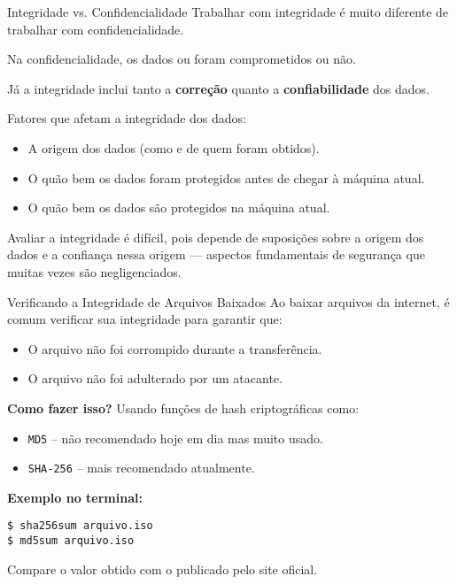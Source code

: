 \begin{frame}{Integridade vs. Confidencialidade}
Trabalhar com integridade é muito diferente de trabalhar com confidencialidade.

\vspace{0.3cm}
Na confidencialidade, os dados ou foram comprometidos ou não.

\vspace{0.3cm}
Já a integridade inclui tanto a \textbf{correção} quanto a \textbf{confiabilidade} dos dados.

\vspace{0.3cm}
Fatores que afetam a integridade dos dados:
\begin{itemize}
    \item A origem dos dados (como e de quem foram obtidos).
    \item O quão bem os dados foram protegidos antes de chegar à máquina atual.
    \item O quão bem os dados são protegidos na máquina atual.
\end{itemize}

\vspace{0.3cm}
Avaliar a integridade é difícil, pois depende de suposições sobre a origem dos dados e a confiança nessa origem — aspectos fundamentais de segurança que muitas vezes são negligenciados.
\end{frame}
\begin{frame}[fragile]{Verificando a Integridade de Arquivos Baixados}
Ao baixar arquivos da internet, é comum verificar sua integridade para garantir que:

\begin{itemize}
    \item O arquivo não foi corrompido durante a transferência.
    \item O arquivo não foi adulterado por um atacante.
\end{itemize}

\vspace{0.3cm}
\textbf{Como fazer isso?} Usando funções de hash criptográficas como:

\begin{itemize}
    \item \texttt{MD5} -- não recomendado hoje em dia mas muito usado.
    \item \texttt{SHA-256} -- mais  recomendado atualmente.
\end{itemize}

\vspace{0.3cm}
\textbf{Exemplo no terminal:}

\begin{verbatim}
$ sha256sum arquivo.iso
$ md5sum arquivo.iso
\end{verbatim}

Compare o valor obtido com o publicado pelo site oficial.
\end{frame}


